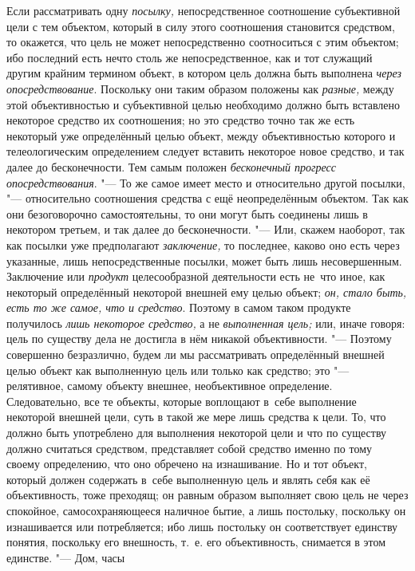 Если рассматривать одну
{\em посылку,}
непосредственное соотношение субъективной цели с тем
объектом, который в силу этого соотношения становится средством, то
окажется, что цель не может непосредственно соотноситься с этим объектом;
ибо последний есть нечто столь же непосредственное, как и тот служащий
другим крайним термином объект, в котором цель должна быть выполнена
{\em через опосредствование}.
Поскольку они таким образом положены как
{\em разные,} между этой
объективностью и субъективной целью необходимо должно быть вставлено
некоторое средство их соотношения; но это средство точно так же есть
некоторый уже определённый целью объект, между объективностью которого и
телеологическим определением следует вставить некоторое новое средство, и
так далее до бесконечности. Тем самым положен
{\em бесконечный прогресс}
{\em опосредствования}. "---
То же самое имеет место и относительно другой
посылки, "--- относительно соотношения средства с ещё
неопределённым объектом. Так как они безоговорочно самостоятельны, то они
могут быть соединены лишь в некотором третьем, и так далее до
бесконечности. "--- Или, скажем наоборот, так как посылки уже
предполагают {\em заключение,}
то последнее, каково оно есть через указанные, лишь
непосредственные посылки, может быть лишь несовершенным. Заключение или
{\em продукт} целесообразной деятельности есть не~что иное, как некоторый
определённый некоторой внешней ему целью объект;
{\em он, стало быть, есть то же самое,
что и средство}. Поэтому в самом таком продукте получилось
{\em лишь некоторое средство,} а не {\em выполненная
цель;} или, иначе говоря: цель по существу дела не достигла
в нём никакой объективности. "--- Поэтому совершенно
безразлично, будем ли мы рассматривать определённый внешней целью объект
как выполненную цель или только как средство; это
"--- релятивное, самому объекту внешнее, необъективное
определение. Следовательно, все те объекты, которые воплощают в~себе
выполнение некоторой внешней цели, суть в такой же мере лишь средства к
цели. То, что должно быть употреблено для выполнения некоторой цели и что
по существу должно считаться средством, представляет собой средство именно
по тому своему определению, что оно обречено на изнашивание. Но и тот
объект, который должен содержать в~себе выполненную цель и являть себя как
её объективность, тоже преходящ; он равным образом выполняет свою цель не
через спокойное, самосохраняющееся наличное бытие, а лишь постольку,
поскольку он изнашивается или потребляется; ибо лишь постольку он
соответствует единству понятия, поскольку его внешность, т.~е. его
объективность, снимается в этом единстве. "--- Дом, часы
